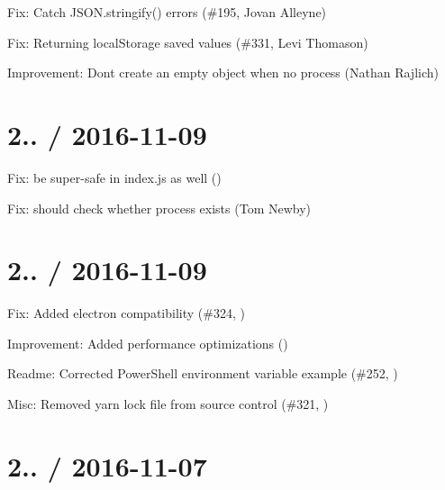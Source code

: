 
\begin{DoxyItemize}
\item Fix\+: Catch {\ttfamily J\+S\+O\+N.\+stringify()} errors (\#195, Jovan Alleyne)
\item Fix\+: Returning {\ttfamily local\+Storage} saved values (\#331, Levi Thomason)
\item Improvement\+: Don\textquotesingle{}t create an empty object when no {\ttfamily process} (Nathan Rajlich)
\end{DoxyItemize}

\section*{2.. / 2016-\/11-\/09 }


\begin{DoxyItemize}
\item Fix\+: be super-\/safe in index.\+js as well ()
\item Fix\+: should check whether process exists (Tom Newby)
\end{DoxyItemize}

\section*{2.. / 2016-\/11-\/09 }


\begin{DoxyItemize}
\item Fix\+: Added electron compatibility (\#324, )
\item Improvement\+: Added performance optimizations ()
\item Readme\+: Corrected Power\+Shell environment variable example (\#252, )
\item Misc\+: Removed yarn lock file from source control (\#321, )
\end{DoxyItemize}

\section*{2.. / 2016-\/11-\/07 }


